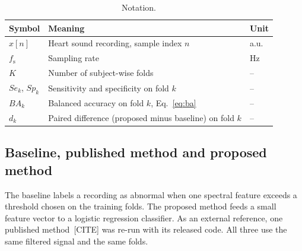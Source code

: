 \begin{table}[t]
\caption{Notation.}
\label{tab:notation}
\centering
\footnotesize
\begin{tabularx}{\linewidth}{@{}lXl@{}}
\toprule
Symbol & Meaning & Unit \\
\midrule
$x[n]$ & Heart sound recording, sample index $n$ & a.u. \\
$f_\mathrm{s}$ & Sampling rate & Hz \\
$K$ & Number of subject-wise folds & -- \\
$\mathit{Se}_k$, $\mathit{Sp}_k$ & Sensitivity and specificity on fold $k$ & -- \\
$\mathit{BA}_k$ & Balanced accuracy on fold $k$, Eq.~\eqref{eq:ba} & -- \\
$d_k$ & Paired difference (proposed minus baseline) on fold $k$ & -- \\
\bottomrule
\end{tabularx}
\end{table}

\subsection{Baseline, published method and proposed method}
\label{sec:method}
The baseline labels a recording as abnormal when one spectral feature exceeds a threshold
chosen on the training folds. The proposed method feeds a small feature vector to a logistic
regression classifier. As an external reference, one published method~[CITE] was re-run with
its released code. All three use the same filtered signal and the same folds.


